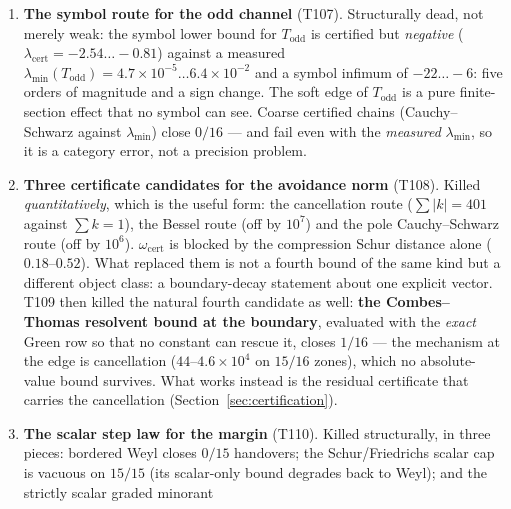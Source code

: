 \documentclass[11pt,a4paper]{article}
\begin{document}
\begin{enumerate}[leftmargin=1.6em,label=\textbf{K\arabic*.}]
demands give $\beta_{\mathrm{int}}\sim10^{-2}$ on $15/15$: an accumulated invariant with absolute
anchoring is false. The reason is transport --- in a larger window an old wing pair becomes an interior
pair and draws $99.7$--$99.95\%$ of its demand from the $64$ softest modes (coupling $751$--$2653\times$
stronger). No self-propagation either ($\beta_{\mathrm{on}}<1$ on $15/15$, loss $13$--$320\times$,
$\theta_k=0.9866$--$0.9998$). \emph{The wing margin is an edge property of the window, not a property of
the pair.} What survives is the window-wise family $\sigma_k(\delta_0)\ge1.31(\mu_k/2)$, uniform in $M$
with drift $\le2.01\times$.
\item \textbf{The symbol route for the odd channel} (T107). Structurally dead, not merely weak: the
symbol lower bound for $T_{\mathrm{odd}}$ is certified but \emph{negative}
($\lambda_{\mathrm{cert}}=-2.54\ldots-0.81$) against a measured
$\lambda_{\min}(T_{\mathrm{odd}})=4.7\times10^{-5}\ldots6.4\times10^{-2}$ and a symbol infimum of
$-22\ldots-6$: five orders of magnitude and a sign change. The soft edge of $T_{\mathrm{odd}}$ is a pure
finite-section effect that no symbol can see. Coarse certified chains (Cauchy--Schwarz against
$\lambda_{\min}$) close $0/16$ --- and fail even with the \emph{measured} $\lambda_{\min}$, so it is a
category error, not a precision problem.
\item \textbf{Three certificate candidates for the avoidance norm} (T108). Killed \emph{quantitatively},
which is the useful form: the cancellation route ($\sum|k|=401$ against $\sum k=1$), the Bessel route
(off by $10^7$) and the pole Cauchy--Schwarz route (off by $10^6$). $\omega_{\mathrm{cert}}$ is blocked
by the compression Schur distance alone ($0.18$--$0.52$). What replaced them is not a fourth bound of
the same kind but a different object class: a boundary-decay statement about one explicit vector.
T109 then killed the natural fourth candidate as well: \textbf{the Combes--Thomas resolvent bound at
the boundary}, evaluated with the \emph{exact} Green row so that no constant can rescue it, closes
$1/16$ --- the mechanism at the edge is cancellation ($44$--$4.6\times10^{4}$ on $15/16$ zones), which
no absolute-value bound survives. What works instead is the residual certificate that carries the
cancellation (Section~\ref{sec:certification}).
\item \textbf{The scalar step law for the margin} (T110). Killed structurally, in three pieces:
bordered Weyl closes $0/15$ handovers; the Schur/Friedrichs scalar cap is vacuous on $15/15$ (its
scalar-only bound degrades back to Weyl); and the strictly scalar graded minorant

\end{enumerate}
\end{document}
